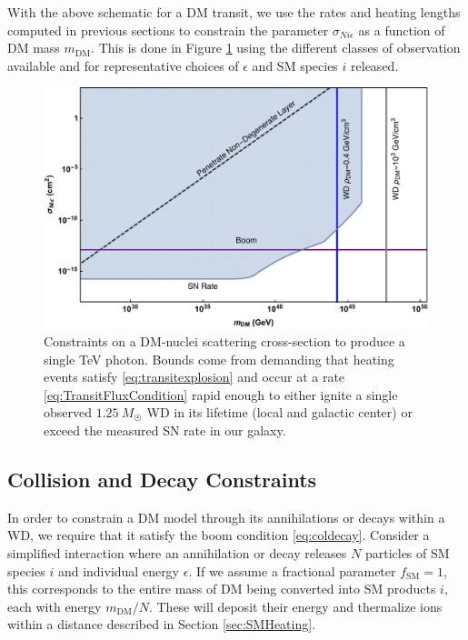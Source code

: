 \documentclass[twocolumn, preprintnumbers,amsmath,amssymb,prd, superscriptaddress]{revtex4}
\begin{document}
With the above schematic for a DM transit, we use the rates and heating lengths computed in previous sections to constrain the parameter $\sigma_{Ni\epsilon}$ as a function of DM mass $m_\text{DM}$.
This is done in Figure \ref{fig:transitclasses} using the different classes of observation available and for representative choices of $\epsilon$ and SM species $i$ released.

\begin{figure}
\includegraphics[scale=.3]{transitobservation.pdf}
\caption{Constraints on a DM-nuclei scattering cross-section to produce a single TeV photon. Bounds come from demanding that heating events satisfy \eqref{eq:transitexplosion} and occur at a rate \eqref{eq:TransitFluxCondition} rapid enough to either ignite a single observed $1.25~M_{\astrosun}$ WD in its lifetime (local and galactic center) or exceed the measured SN rate in our galaxy.}
\label{fig:transitclasses}
\end{figure}

\subsection{Collision and Decay Constraints}
\label{sec:CollisionConstraints}

In order to constrain a DM model through its annihilations or decays within a WD, we require that it satisfy the boom condition \eqref{eq:coldecay}.
Consider a simplified interaction where an annihilation or decay releases $N$ particles of SM species $i$ and individual energy $\epsilon$.
If we assume a fractional parameter $f_\text{SM}=1$, this corresponds to the entire mass of DM being converted into SM products $i$, each with energy $m_\text{DM}/N$.
These will deposit their energy and thermalize ions within a distance described in Section \ref{sec:SMHeating}.
\end{document}
